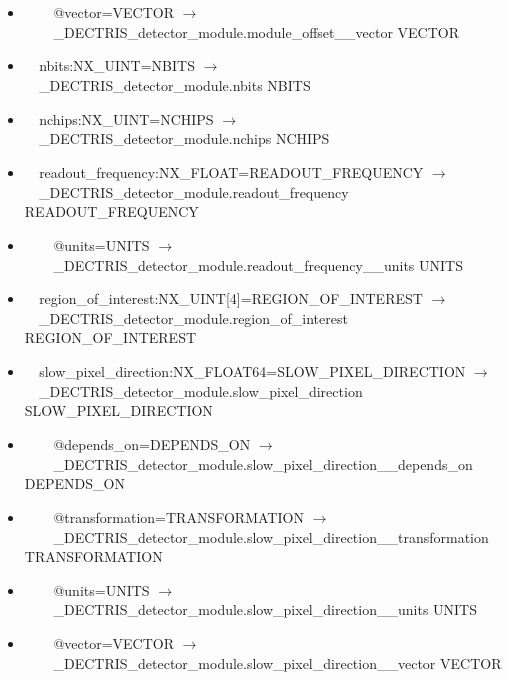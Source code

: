 \documentclass[11pt]{article}
\begin{document}
{{\begin{itemize}
\item{\verb|    |@vector=VECTOR $\rightarrow$\\
\verb|    |\_DECTRIS\_detector\_module.module\_offset\_\_vector VECTOR}

\item{\verb|  |nbits:NX\_UINT=NBITS $\rightarrow$\\
\verb|  |\_DECTRIS\_detector\_module.nbits NBITS}

\item{\verb|  |nchips:NX\_UINT=NCHIPS $\rightarrow$\\
\verb|  |\_DECTRIS\_detector\_module.nchips NCHIPS}

\item{\verb|  |readout\_frequency:NX\_FLOAT=READOUT\_FREQUENCY $\rightarrow$\\
\verb|  |\_DECTRIS\_detector\_module.readout\_frequency READOUT\_FREQUENCY}

\item{\verb|    |@units=UNITS $\rightarrow$\\
\verb|    |\_DECTRIS\_detector\_module.readout\_frequency\_\_units UNITS}

\item{\verb|  |region\_of\_interest:NX\_UINT[4]=REGION\_OF\_INTEREST $\rightarrow$\\
\verb|  |\_DECTRIS\_detector\_module.region\_of\_interest REGION\_OF\_INTEREST}

\item{\verb|  |slow\_pixel\_direction:NX\_FLOAT64=SLOW\_PIXEL\_DIRECTION $\rightarrow$\\
\verb|  |\_DECTRIS\_detector\_module.slow\_pixel\_direction SLOW\_PIXEL\_DIRECTION}

\item{\verb|    |@depends\_on=DEPENDS\_ON $\rightarrow$\\
\verb|    |\_DECTRIS\_detector\_module.slow\_pixel\_direction\_\_depends\_on DEPENDS\_ON}

\item{\verb|    |@transformation=TRANSFORMATION $\rightarrow$\\
\verb|    |\_DECTRIS\_detector\_module.slow\_pixel\_direction\_\_transformation TRANSFORMATION}

\item{\verb|    |@units=UNITS $\rightarrow$\\
\verb|    |\_DECTRIS\_detector\_module.slow\_pixel\_direction\_\_units UNITS}

\item{\verb|    |@vector=VECTOR $\rightarrow$\\
\verb|    |\_DECTRIS\_detector\_module.slow\_pixel\_direction\_\_vector VECTOR}


\end{itemize}}}
\end{document}
